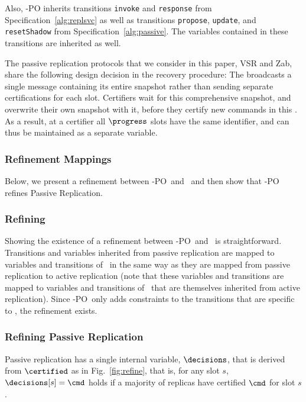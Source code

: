 Also, \multiconsensus-PO inherits transitions \texttt{invoke} and \texttt{response} from Specification~\ref{alg:replsvc} as well as transitions
\texttt{propose}, \texttt{update}, and \texttt{resetShadow} from Specification~\ref{alg:passive}.  The variables contained in these transitions are inherited as well.

The passive replication protocols that we consider in this paper,
VSR and Zab,
share the following design decision in the recovery procedure: The
{\sequencer} broadcasts a single message containing its entire
snapshot rather than sending separate certifications for each slot.
Certifiers wait for this comprehensive snapshot, and overwrite their
own snapshot with it, before they certify new commands in this {\round}.
As a result, at a certifier all $\progress$ slots have the same {\round}
identifier, and can thus be maintained as a separate variable.  

\subsubsection{Refinement Mappings}
\label{sec:MCPO:refinement}

Below, we present a refinement between \multiconsensus-PO\ and \multiconsensus\ and then show that \multiconsensus-PO refines Passive Replication.

\subsubsection{Refining \multiconsensus}

Showing the existence of a refinement between \multiconsensus-PO\
and \multiconsensus\ is straightforward.  Transitions and variables
inherited from passive replication are mapped to variables and
transitions of \multiconsensus\ in the same way as they are mapped
from passive replication to active replication (note that these
variables and transitions are mapped to variables and transitions
of \multiconsensus\ that are themselves inherited from active
replication).  Since \multiconsensus-PO\ only adds constraints to
the transitions that are specific to \multiconsensus, the refinement
exists.

\subsubsection{Refining Passive Replication}
Passive replication has a single internal variable, $\decisions$,
that is derived from $\certified$ as in Fig.~\ref{fig:refine},
that is, for any slot $s$, $\decisions[s] = \cmd$ holds if a majority
of replicas have certified $\cmd$ for slot $s$.

